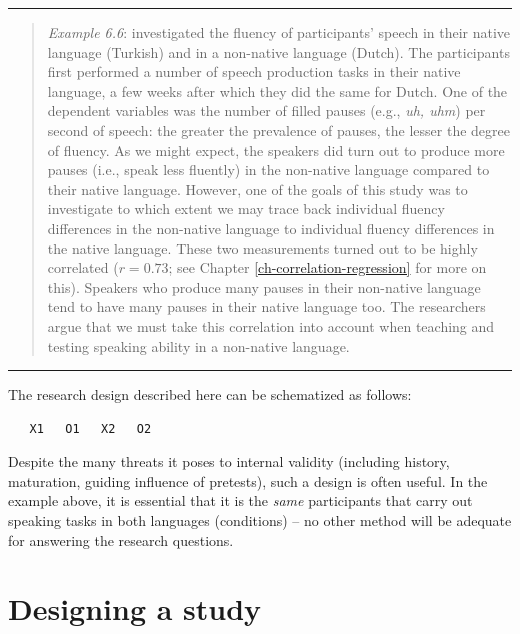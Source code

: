 \documentclass[
]{book}
\begin{document}
\begin{center}\rule{0.5\linewidth}{0.5pt}\end{center}

\begin{quote}
\emph{Example 6.6}: \citet{JGSH13} investigated the fluency of participants' speech in their native language (Turkish) and in a non-native language (Dutch). The participants first performed a number of speech production tasks in their native language, a few weeks after which they did the same for Dutch. One of the dependent variables was the number of filled pauses (e.g., \emph{uh, uhm}) per second of speech: the greater the prevalence of pauses, the lesser the degree of fluency. As we might expect, the speakers did turn out to produce more pauses (i.e., speak less fluently) in the non-native language compared to their native language. However, one of the goals of this study was to investigate to which extent we may trace back individual fluency differences in the non-native language to individual fluency differences in the native language. These two measurements turned out to be highly correlated (\(r = 0.73\); see Chapter \ref{ch-correlation-regression} for more on this). Speakers who produce many pauses in their non-native language tend to have many pauses in their native language too. The researchers argue that we must take this correlation into account when teaching and testing speaking ability in a non-native language.
\end{quote}

\begin{center}\rule{0.5\linewidth}{0.5pt}\end{center}

The research design described here can be schematized as follows:

\begin{verbatim}
   X1   O1   X2   O2
\end{verbatim}

Despite the many threats it poses to internal validity (including history, maturation, guiding influence of pretests), such a design is often useful. In the example above, it is essential that it is the \emph{same} participants that carry out speaking tasks in both languages (conditions) -- no other method will be adequate for answering the research questions.

\hypertarget{designing-a-study}{%
\section{Designing a study}\label{designing-a-study}}
\end{document}
